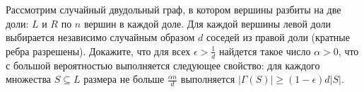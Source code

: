 Рассмотрим случайный двудольный граф, в котором вершины разбиты на две доли: $L$ и $R$ по $n$ вершин в каждой доле. Для
каждой вершины левой доли выбирается независимо случайным образом $d$ соседей из правой доли (кратные ребра
разрешены). Докажите, что для всех $\epsilon > \frac{1}{d}$ найдется такое число $\alpha > 0$, что с большой вероятностью
выполняется следующее свойство: для каждого множества $S \subseteq L$ размера не больше $\frac{\alpha n}{d}$ выполняется
$|\Gamma(S)| \ge (1 - \epsilon)d |S|$.